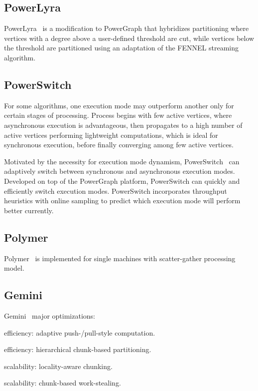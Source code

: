 \documentclass[UTF8,12pt,a4paper]{article}
\begin{document}
\subsection{PowerLyra}
PowerLyra~\cite{DBLP:conf/eurosys/ChenSCC15}
is a modification to PowerGraph that hybridizes partitioning
where vertices with a degree above a user-defined threshold are cut,
while vertices below the threshold are partitioned using
an adaptation of the FENNEL streaming algorithm.

\subsection{PowerSwitch}
For some algorithms, one execution mode may outperform another
only for certain stages of processing.
Process begins with few active vertices,
where asynchronous execution is advantageous,
then propagates to a high number of active vertices performing lightweight computations,
which is ideal for synchronous execution,
before finally converging among few active vertices.

Motivated by the necessity for execution mode dynamism,
PowerSwitch~\cite{DBLP:conf/ppopp/XieCGZC15}
can adaptively switch between synchronous and asynchronous execution modes.
Developed on top of the PowerGraph platform,
PowerSwitch can quickly and efficiently switch execution modes.
PowerSwitch incorporates throughput heuristics with online sampling
to predict which execution mode will perform better currently.

\subsection{Polymer}
Polymer~\cite{DBLP:conf/ppopp/ZhangCC15} is implemented for
single machines with scatter-gather processing model.

\subsection{Gemini}
Gemini~\cite{DBLP:conf/osdi/ZhuCZM16} major optimizations:
\begin{compactitem}
  \item efficiency: adaptive push-/pull-style computation.
  \item efficiency: hierarchical chunk-based	partitioning.
  \item scalability: locality-aware	chunking.
  \item scalability: chunk-based work-stealing.
\end{compactitem}
\end{document}
